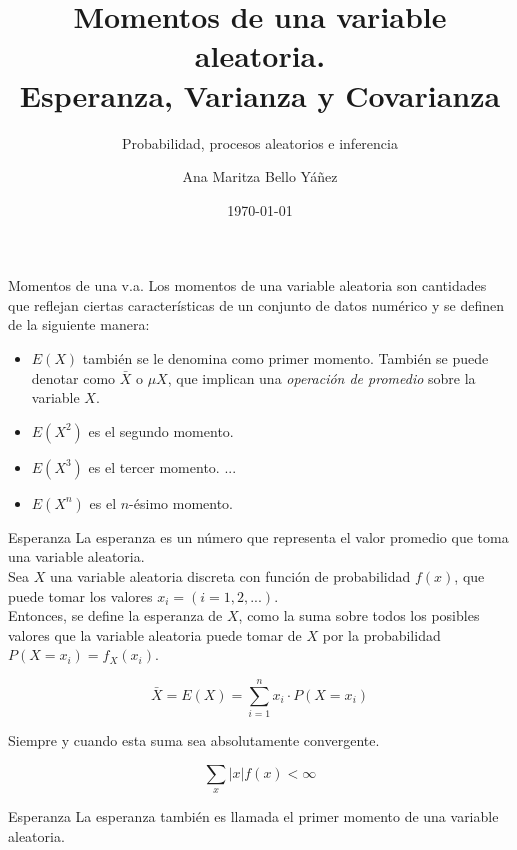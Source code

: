 \documentclass{beamer}
\title[ \hspace{21mm} \insertframenumber \ de \inserttotalframenumber ]
{Momentos de una variable aleatoria. \\Esperanza, Varianza y Covarianza}
\subtitle
{Probabilidad, procesos aleatorios e inferencia}
\author[]
{Ana Maritza Bello Yáñez}
\institute[Instituto Polit\'ecnico Nacional]
{
  \inst{1}
  Centro de Investigaci\'on en Computaci\'on
  }
\date[Short Occasion]
{\today}
\begin{document}
\begin{frame}
  \titlepage
\end{frame}

\begin{frame}{Momentos de una v.a.}
Los momentos de una variable aleatoria son cantidades que reflejan ciertas
características de un conjunto de datos numérico y se definen de la
siguiente manera:

\begin{itemize}
\item $E(X)$ también se le denomina como primer momento. También se puede
denotar como $\bar{X}$ o $\mu{X}$, que implican una \textit{operación de
promedio} sobre la variable $X$.
  \item $E(X^2)$ es el segundo momento.
  \item $E(X^3)$ es el tercer momento.
  ...
  \item $E(X^n)$ es el $n$-ésimo momento.
\end{itemize}

\end{frame}


\begin{frame}{Esperanza}
La esperanza es un número que representa el valor promedio que toma una variable
aleatoria.\\

Sea $X$ una variable aleatoria discreta con función de probabilidad $f(x)$, que
puede tomar los valores $x_i=(i=1,2,...)$.\\

Entonces, se define la esperanza de $X$, como la suma sobre todos los posibles
valores que la variable aleatoria puede tomar de $X$ por la probabilidad $P(X=x_i)=f_{X}(x_i)$.

\begin{equation}
  \bar{X} = E(X) = \sum_{i=1}^{n} x_i \cdot P(X=x_i)
\end{equation}

Siempre y cuando esta suma sea absolutamente convergente.

\begin{equation}
  \sum_{x} |x| f(x) < \infty
\end{equation}

\end{frame}

\begin{frame}{Esperanza}
  La esperanza también es llamada el primer momento de una variable aleatoria.
\end{frame}

\begin{frame}{}
\end{frame}

\begin{frame}{}
\end{frame}

\begin{frame}{}
\end{frame}
\end{document}
